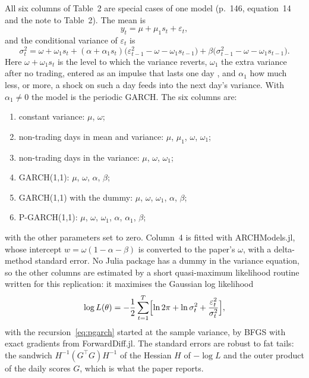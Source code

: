 \documentclass[11pt]{article}
\begin{document}
All six columns of Table~2 are special cases of one model (p.~146, equation~14 and the note to Table~2). The mean is
\begin{equation}
  y_t = \mu + \mu_1 s_t + \varepsilon_t,
\end{equation}
and the conditional variance of $\varepsilon_t$ is
\begin{equation}
  \sigma_t^2 = \omega + \omega_1 s_t
    + (\alpha + \alpha_1 s_t)\bigl(\varepsilon_{t-1}^2 - \omega - \omega_1 s_{t-1}\bigr)
    + \beta\bigl(\sigma_{t-1}^2 - \omega - \omega_1 s_{t-1}\bigr).
  \label{eq:pgarch}
\end{equation}
Here $\omega + \omega_1 s_t$ is the level to which the variance reverts, $\omega_1$ the extra variance after no trading, entered as an impulse that lasts one day \citep{baillie1989message}, and $\alpha_1$ how much less, or more, a shock on such a day feeds into the next day's variance. With $\alpha_1 \neq 0$ the model is the periodic GARCH. The six columns are:
\begin{enumerate}
  \item constant variance: $\mu$, $\omega$;
  \item non-trading days in mean and variance: $\mu$, $\mu_1$, $\omega$, $\omega_1$;
  \item non-trading days in the variance: $\mu$, $\omega$, $\omega_1$;
  \item GARCH(1,1): $\mu$, $\omega$, $\alpha$, $\beta$;
  \item GARCH(1,1) with the dummy: $\mu$, $\omega$, $\omega_1$, $\alpha$, $\beta$;
  \item P-GARCH(1,1): $\mu$, $\omega$, $\omega_1$, $\alpha$, $\alpha_1$, $\beta$;
\end{enumerate}
with the other parameters set to zero. Column~4 is fitted with ARCHModels.jl, whose intercept $w = \omega(1-\alpha-\beta)$ is converted to the paper's $\omega$, with a delta-method standard error. No Julia package has a dummy in the variance equation, so the other columns are estimated by a short quasi-maximum likelihood routine written for this replication: it maximises the Gaussian log likelihood
\begin{equation}
  \log L(\theta) = -\frac12 \sum_{t=1}^{T} \Bigl[\ln 2\pi + \ln\sigma_t^2 + \frac{\varepsilon_t^2}{\sigma_t^2}\Bigr],
\end{equation}
with the recursion~\eqref{eq:pgarch} started at the sample variance, by BFGS with exact gradients from ForwardDiff.jl. The standard errors are robust to fat tails: the sandwich $H^{-1} (G^\top G) H^{-1}$ of the Hessian $H$ of $-\log L$ and the outer product of the daily scores $G$, which is what the paper reports.
\end{document}
